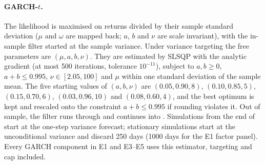 \paragraph{\texorpdfstring{GARCH-$t$}{GARCH-t}.}
The likelihood is maximised on returns divided by their sample standard deviation ($\mu$ and
$\omega$ are mapped back; $a$, $b$ and $\nu$ are scale invariant), with the in-sample filter
started at the sample variance. Under variance targeting \citep{francq_2011_merits} the free
parameters are $(\mu,a,b,\nu)$. They are estimated by SLSQP with the analytic gradient (at most
500 iterations, tolerance $10^{-11}$), subject to $a,b\ge0$, $a+b\le0.995$, $\nu\in[2.05,100]$
and $\mu$ within one standard deviation of the sample mean. The five starting values of
$(a,b,\nu)$ are $(0.05,0.90,8)$, $(0.10,0.85,5)$, $(0.15,0.70,6)$, $(0.03,0.96,10)$ and
$(0.08,0.60,4)$, and the best optimum is kept and rescaled onto the constraint $a+b\le0.995$ if rounding violates it. Out
of sample, the filter runs through \TRAIN{} and continues into \TEST{}. Simulations from the end
of \TRAIN{} start at the one-step variance forecast; stationary simulations start at the
unconditional variance and discard 250 days (1000 days for the E1 factor panel). Every GARCH
component in E1 and E3--E5 uses this estimator, targeting and cap included.

